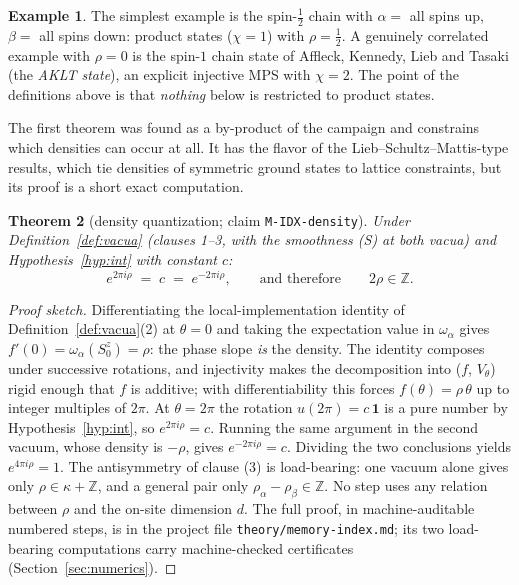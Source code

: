 \documentclass[11pt]{article}
\newtheorem{theorem}{Theorem}[section]
\theoremstyle{definition}
\newtheorem{example}[theorem]{Example}
\theoremstyle{remark}
\newcommand{\Z}{\mathbb{Z}}
\begin{document}
\begin{example}
The simplest example is the spin-$\tfrac12$ chain with
$\alpha=$ all spins up, $\beta=$ all spins down: product states ($\chi=1$)
with $\rho=\tfrac12$.  A genuinely correlated example with $\rho=0$ is the
spin-$1$ chain state of Affleck, Kennedy, Lieb and Tasaki (the \emph{AKLT
state}), an explicit injective MPS with $\chi=2$.  The point of the definitions above is that
\emph{nothing} below is restricted to product states.
\end{example}

The first theorem was found as a by-product of the campaign and constrains
which densities can occur at all.  It has the flavor of the
Lieb--Schultz--Mattis-type results, which tie densities of symmetric ground
states to lattice constraints, but its proof is a short exact computation.

\begin{theorem}[density quantization; claim \texttt{M-IDX-density}]
\label{thm:density}
Under Definition~\ref{def:vacua} (clauses 1--3, with the smoothness (S) at
both vacua) and Hypothesis~\ref{hyp:int} with constant $c$:
\[
e^{2\pi i\rho}\;=\;c\;=\;e^{-2\pi i\rho},
\qquad\text{and therefore}\qquad 2\rho\in\Z .
\]
\end{theorem}

\begin{proof}[Proof sketch]
Differentiating the local-implementation identity of
Definition~\ref{def:vacua}(2) at $\theta=0$ and taking the expectation value
in $\omega_\alpha$ gives $f'(0)=\omega_\alpha(S^z_0)=\rho$: the phase slope
\emph{is} the density.  The identity composes under successive rotations, and
injectivity makes the decomposition into ($f$, $V_\theta$) rigid enough that
$f$ is additive; with differentiability this forces
$f(\theta)=\rho\,\theta$ up to integer multiples of $2\pi$.  At $\theta=2\pi$
the rotation $u(2\pi)=c\,\mathbf{1}$ is a pure number by
Hypothesis~\ref{hyp:int}, so $e^{2\pi i\rho}=c$.  Running the same argument in
the second vacuum, whose density is $-\rho$, gives $e^{-2\pi i\rho}=c$.
Dividing the two conclusions yields $e^{4\pi i\rho}=1$.  The antisymmetry of
clause (3) is load-bearing: one vacuum alone gives only $\rho\in\kappa+\Z$,
and a general pair only $\rho_\alpha-\rho_\beta\in\Z$.  No step uses any
relation between $\rho$ and the on-site dimension $d$.  The full proof, in
machine-auditable numbered steps, is in the project file
\texttt{theory/memory-index.md}; its two load-bearing computations carry
machine-checked certificates (Section~\ref{sec:numerics}).
\end{proof}
\end{document}
